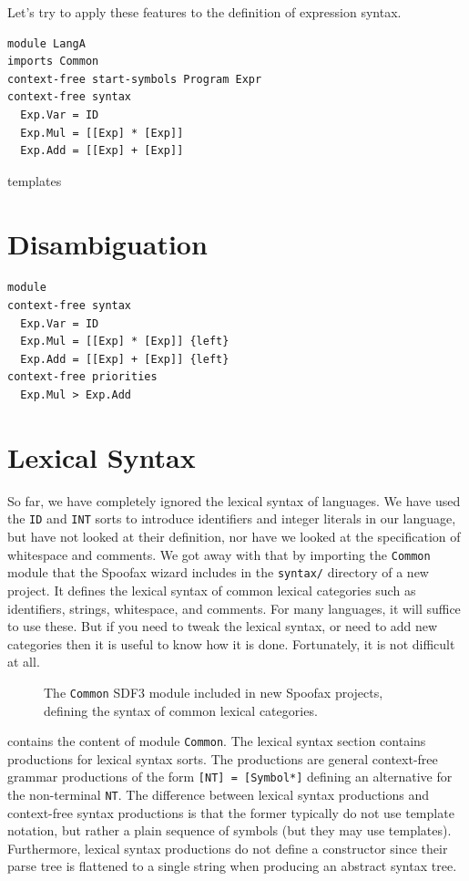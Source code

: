 Let's try to apply these features to the definition of expression syntax.

\begin{lstlisting}[language=SDF]
module LangA
imports Common
context-free start-symbols Program Expr
context-free syntax
  Exp.Var = ID
  Exp.Mul = [[Exp] * [Exp]]
  Exp.Add = [[Exp] + [Exp]]
\end{lstlisting}

templates \cite{VollebregtKV12}


\section{Disambiguation}

\begin{lstlisting}[language=SDF]
module 
context-free syntax
  Exp.Var = ID
  Exp.Mul = [[Exp] * [Exp]] {left}
  Exp.Add = [[Exp] + [Exp]] {left}
context-free priorities
  Exp.Mul > Exp.Add
\end{lstlisting}

\section{Lexical Syntax}

So far, we have completely ignored the lexical syntax of languages. We have used
the \texttt{ID} and \texttt{INT} sorts to introduce identifiers and integer
literals in our language, but have not looked at their definition, nor have we
looked at the specification of whitespace and comments. We got away with that by
importing the \texttt{Common} module that the Spoofax wizard includes in the
\texttt{syntax/} directory of a new project. It defines the lexical syntax of
common lexical categories such as identifiers, strings, whitespace, and
comments. For many languages, it will suffice to use these. But if you need to
tweak the lexical syntax, or need to add new categories then it is useful to
know how it is done. Fortunately, it is not difficult at all. 

\begin{figure}

\caption{The \texttt{Common} SDF3 module included in new Spoofax projects,
defining the syntax of common lexical categories.}
\end{figure}

 contains the content of module \texttt{Common}.
The lexical syntax section contains productions for lexical syntax sorts.
The productions are general context-free grammar productions of the form
\texttt{[NT] = [Symbol*]} defining an alternative for the non-terminal
\texttt{NT}. The difference between lexical syntax productions and context-free
syntax productions is that the former typically do not use template notation,
but rather a plain sequence of symbols (but they may use templates).
Furthermore, lexical syntax productions do not define a constructor since their
parse tree is flattened to a single string when producing an abstract syntax
tree.


